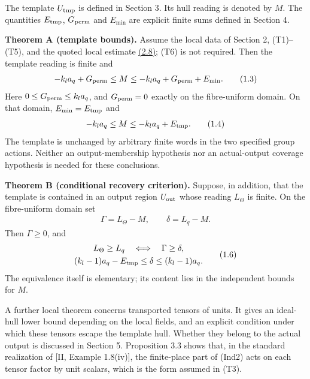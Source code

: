 \documentclass[11pt,a4paper]{amsart}
\begin{document}
The template $U_{\rm tmp}$ is defined in Section 3. Its hull reading is denoted by $M$. The quantities $E_{\rm tmp}$, $G_{\rm perm}$ and $E_{\min}$ are explicit finite sums defined in Section 4.


\par\smallskip\noindent\textbf{Theorem A (template bounds).} Assume the local data of Section 2, (T1)--(T5), and the quoted local estimate \hyperref[eq:2.8]{(2.8)}; (T6) is not required. Then the template reading is finite and
\begin{equation}
\begin{gathered}
-k_la_q+G_{\rm perm}\le M\le-k_la_q+G_{\rm perm}+E_{\min}.
\end{gathered}
\tag{1.3}\label{eq:1.3}
\end{equation}
Here $0\le G_{\rm perm}\le k_la_q$, and $G_{\rm perm}=0$ exactly on the fibre-uniform domain. On that domain, $E_{\min}=E_{\rm tmp}$ and
\begin{equation}
\begin{gathered}
-k_la_q\le M\le-k_la_q+E_{\rm tmp}.
\end{gathered}
\tag{1.4}\label{eq:1.4}
\end{equation}
The template is unchanged by arbitrary finite words in the two specified group actions. Neither an output-membership hypothesis nor an actual-output coverage hypothesis is needed for these conclusions.


\par\smallskip\noindent\textbf{Theorem B (conditional recovery criterion).} Suppose, in addition, that the template is contained in an output region $U_{\rm out}$ whose reading $L_\Theta$ is finite. On the fibre-uniform domain set
\begin{equation}
\begin{gathered}
\Gamma=L_\Theta-M,\qquad\delta=L_q-M.
\end{gathered}
\tag{1.5}\label{eq:1.5}
\end{equation}
Then $\Gamma\ge0$, and
\begin{equation}
\begin{gathered}
L_\Theta\ge L_q\quad\Longleftrightarrow\quad\Gamma\ge\delta,\\ (k_l-1)a_q-E_{\rm tmp}\le\delta\le(k_l-1)a_q.
\end{gathered}
\tag{1.6}\label{eq:1.6}
\end{equation}
The equivalence itself is elementary; its content lies in the independent bounds for $M$.


A further local theorem concerns transported tensors of units. It gives an ideal-hull lower bound depending on the local fields, and an explicit condition under which these tensors escape the template hull. Whether they belong to the actual output is discussed in Section 5. Proposition 3.3 shows that, in the standard realization of [II, Example 1.8(iv)], the finite-place part of (Ind2) acts on each tensor factor by unit scalars, which is the form assumed in (T3).
\end{document}
